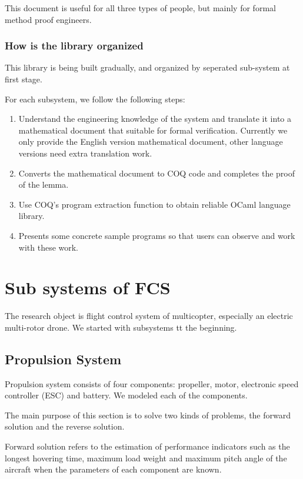 \documentclass{article} %
\numberwithin{equation}{section} %
\begin{document}
This document is useful for all three types of people, but mainly for formal method proof engineers.

\subsubsection{How is the library organized}
This library is being built gradually, and organized by seperated sub-system at first stage.

For each subsystem, we follow the following steps:
\begin{enumerate}
\item Understand the engineering knowledge of the system and translate it into a mathematical document that suitable for formal verification.
Currently we only provide the English version mathematical document, other language versions need extra translation work.
\item Converts the mathematical document to COQ code and completes the proof of the lemma.
\item Use COQ's program extraction function to obtain reliable OCaml language library.
\item Presents some concrete sample programs so that users can observe and work with these work.
\end{enumerate}



\section{Sub systems of FCS}

The research object is flight control system of multicopter, especially an electric multi-rotor drone.
We started with subsystems tt the beginning.

\subsection{Propulsion System}
Propulsion system consists of four components: propeller, motor, electronic speed controller (ESC) and battery.
We modeled each of the components.

The main purpose of this section is to solve two kinds of problems, the forward solution and the reverse solution.

Forward solution refers to the estimation of performance indicators such as the longest hovering time, maximum load weight and maximum pitch angle of the aircraft when the parameters of each component are known.
\end{document}
